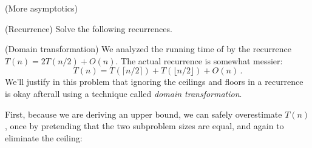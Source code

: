 \begin{questions}
  \question (More asymptotics)

  
  \newpage
  
  \question (Recurrence) Solve the following recurrences.


  \newpage

  \question[10] (Domain transformation) We analyzed the running time
  of  by the recurrence $T(n) = 2T(n/2) +O(n)$. The
  actual  recurrence is somewhat messier:
  \[T(n) = T(\lceil n/2 \rceil) + T(\lfloor n/2 \rfloor) +O(n) \, .\]
  We'll justify in this problem that ignoring the ceilings and floors
  in a recurrence is okay afterall using a technique called
  \emph{domain transformation}.

  First, because we are deriving an upper bound, we can safely
  overestimate $T(n)$, once by pretending that the two subproblem
  sizes are equal, and again to eliminate the ceiling:


\end{questions}
